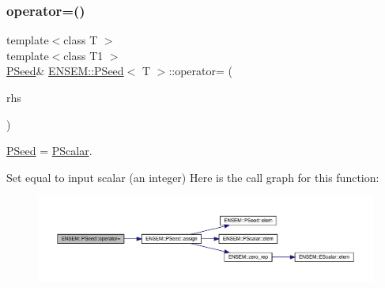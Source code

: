 \mbox{\label{classENSEM_1_1PSeed_aa7d9ec1f6a7cca8ee109c29d75482350}} 
\subsubsection{\texorpdfstring{operator=()}{operator=()}\hspace{0.1cm}{\footnotesize\ttfamily [1/4]}}
{\footnotesize\ttfamily template$<$class T $>$ \\
template$<$class T1 $>$ \\
\mbox{\hyperlink{classENSEM_1_1PSeed}{P\+Seed}}\& \mbox{\hyperlink{classENSEM_1_1PSeed}{E\+N\+S\+E\+M\+::\+P\+Seed}}$<$ T $>$\+::operator= (\begin{DoxyParamCaption}\item[{const \mbox{\hyperlink{classENSEM_1_1PScalar}{P\+Scalar}}$<$ T1 $>$ \&}]{rhs }\end{DoxyParamCaption})\hspace{0.3cm}{\ttfamily [inline]}}



\mbox{\hyperlink{classENSEM_1_1PSeed}{P\+Seed}} = \mbox{\hyperlink{classENSEM_1_1PScalar}{P\+Scalar}}. 

Set equal to input scalar (an integer) Here is the call graph for this function\+:
\nopagebreak
\begin{figure}[H]
\begin{center}
\leavevmode
\includegraphics[width=350pt]{dc/d14/classENSEM_1_1PSeed_aa7d9ec1f6a7cca8ee109c29d75482350_cgraph}
\end{center}
\end{figure}
\mbox{\label{classENSEM_1_1PSeed_aa7d9ec1f6a7cca8ee109c29d75482350}} 

